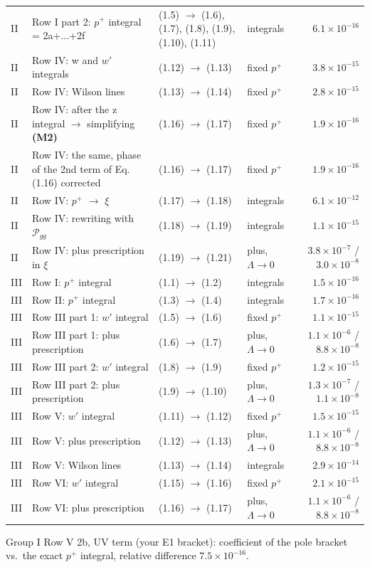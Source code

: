 \documentclass[10pt]{article}
\numberwithin{equation}{section}
\begin{document}
{\begin{longtable}{@{}lp{}p{}lr@{}}
II & Row I part 2: $p^+$ integral = 2a+...+2f & (1.5) $\to$ (1.6), (1.7), (1.8), (1.9), (1.10), (1.11) & integrals & $6.1\times10^{-16}$\\
II & Row IV: w and $w'$ integrals & (1.12) $\to$ (1.13) & fixed $p^+$ & $3.8\times10^{-15}$\\
II & Row IV: Wilson lines & (1.13) $\to$ (1.14) & fixed $p^+$ & $2.8\times10^{-15}$\\
II & Row IV: after the z integral $\to$ simplifying \textbf{(M2)} & (1.16) $\to$ (1.17) & fixed $p^+$ & $1.9\times10^{-16}$\\
II & Row IV: the same, phase of the 2nd term of Eq. (1.16) corrected & (1.16) $\to$ (1.17) & fixed $p^+$ & $1.9\times10^{-16}$\\
II & Row IV: $p^+$ $\to$ $\xi$ & (1.17) $\to$ (1.18) & integrals & $6.1\times10^{-12}$\\
II & Row IV: rewriting with $\mathcal P_{gg}$ & (1.18) $\to$ (1.19) & integrals & $1.1\times10^{-15}$\\
II & Row IV: plus prescription in $\xi$ & (1.19) $\to$ (1.21) & plus, $\Lambda\to0$ & $3.8\times10^{-7}$ / $3.0\times10^{-8}$\\
III & Row I: $p^+$ integral & (1.1) $\to$ (1.2) & integrals & $1.5\times10^{-16}$\\
III & Row II: $p^+$ integral & (1.3) $\to$ (1.4) & integrals & $1.7\times10^{-16}$\\
III & Row III part 1: $w'$ integral & (1.5) $\to$ (1.6) & fixed $p^+$ & $1.1\times10^{-15}$\\
III & Row III part 1: plus prescription & (1.6) $\to$ (1.7) & plus, $\Lambda\to0$ & $1.1\times10^{-6}$ / $8.8\times10^{-8}$\\
III & Row III part 2: $w'$ integral & (1.8) $\to$ (1.9) & fixed $p^+$ & $1.2\times10^{-15}$\\
III & Row III part 2: plus prescription & (1.9) $\to$ (1.10) & plus, $\Lambda\to0$ & $1.3\times10^{-7}$ / $1.1\times10^{-8}$\\
III & Row V: $w'$ integral & (1.11) $\to$ (1.12) & fixed $p^+$ & $1.5\times10^{-15}$\\
III & Row V: plus prescription & (1.12) $\to$ (1.13) & plus, $\Lambda\to0$ & $1.1\times10^{-6}$ / $8.8\times10^{-8}$\\
III & Row V: Wilson lines & (1.13) $\to$ (1.14) & integrals & $2.9\times10^{-14}$\\
III & Row VI: $w'$ integral & (1.15) $\to$ (1.16) & fixed $p^+$ & $2.1\times10^{-15}$\\
III & Row VI: plus prescription & (1.16) $\to$ (1.17) & plus, $\Lambda\to0$ & $1.1\times10^{-6}$ / $8.8\times10^{-8}$\\
\bottomrule
\end{longtable}}
\noindent Group I Row V 2b, UV term (your E1 bracket): coefficient of the pole bracket vs.\ the exact $p^+$ integral, relative difference $7.5\times10^{-16}$.
\end{document}
